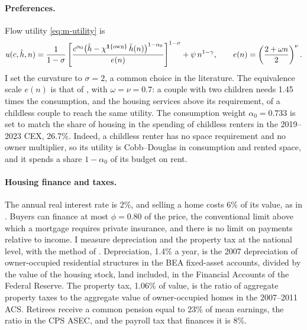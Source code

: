 \paragraph{Preferences.}
Flow utility \eqref{eq:m-utility} is
\begin{equation*}
 u(c,\hat h,n)=\frac{1}{1-\sigma}\left[\frac{c^{\alpha_0}\bigl(\hat h-\chi^{\mathbf 1\{\text{own}\}}\,\bar h(n)\bigr)^{1-\alpha_0}}{e(n)}\right]^{1-\sigma}+\psi\,n^{1-\gamma},
 \qquad e(n)=\left(\frac{2+\omega n}{2}\right)^{\nu}.
\end{equation*}
I set the curvature to $\sigma=2$, a common choice in the literature. The equivalence scale
$e(n)$ is that of \citet{scholzSeshadriKhitatrakunSaving2006}, with
$\omega=\nu=0.7$: a couple with two children needs 1.45 times the
consumption, and the housing services above its requirement, of a childless
couple to reach the same utility. The consumption weight $\alpha_0=0.733$
is set to match the share of housing in the spending of childless renters in
the 2019--2023 CEX, 26.7\%. Indeed, a childless renter has no space
requirement and no owner multiplier, so its utility is Cobb--Douglas in
consumption and rented space, and it spends a share $1-\alpha_0$ of its
budget on rent.

\paragraph{Housing finance and taxes.}
The annual real interest rate is 2\%, and selling a home costs 6\% of its
value, as in \citet{greaneyDynamicUrbanEconomics2025}. Buyers can finance at
most $\phi=0.80$ of the price, the conventional limit above which a mortgage
requires private insurance, and there is no limit on payments relative to
income. I measure depreciation and the property tax at the national level,
with the method of \citet{greaneyDynamicUrbanEconomics2025}. Depreciation,
1.4\% a year, is the 2007 depreciation of owner-occupied residential
structures in the BEA fixed-asset accounts, divided by the value of the
housing stock, land included, in the Financial Accounts of the Federal
Reserve. The property tax, 1.06\% of value, is the ratio of aggregate
property taxes to the aggregate value of owner-occupied homes in the
2007--2011 ACS. Retirees receive a common pension equal to 23\% of mean
earnings, the ratio in the CPS ASEC, and the payroll tax that finances it is
8\%.

